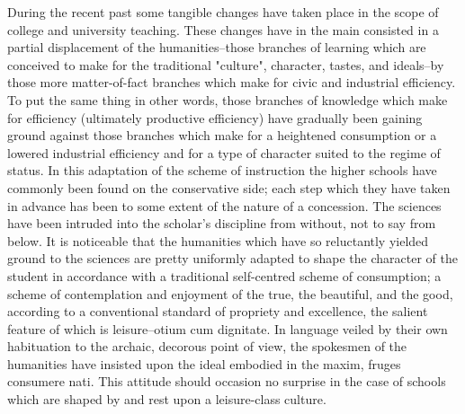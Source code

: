 \documentclass[12pt]{report}
\begin{document}
During the recent past some tangible changes have taken place in the
scope of college and university teaching. These changes have in the main
consisted in a partial displacement of the humanities--those branches
of learning which are conceived to make for the traditional "culture",
character, tastes, and ideals--by those more matter-of-fact branches
which make for civic and industrial efficiency. To put the same thing
in other words, those branches of knowledge which make for efficiency
(ultimately productive efficiency) have gradually been gaining ground
against those branches which make for a heightened consumption or a
lowered industrial efficiency and for a type of character suited to the
regime of status. In this adaptation of the scheme of instruction the
higher schools have commonly been found on the conservative side; each
step which they have taken in advance has been to some extent of
the nature of a concession. The sciences have been intruded into
the scholar's discipline from without, not to say from below. It is
noticeable that the humanities which have so reluctantly yielded ground
to the sciences are pretty uniformly adapted to shape the character
of the student in accordance with a traditional self-centred scheme of
consumption; a scheme of contemplation and enjoyment of the true,
the beautiful, and the good, according to a conventional standard of
propriety and excellence, the salient feature of which is leisure--otium
cum dignitate. In language veiled by their own habituation to the
archaic, decorous point of view, the spokesmen of the humanities have
insisted upon the ideal embodied in the maxim, fruges consumere nati.
This attitude should occasion no surprise in the case of schools which
are shaped by and rest upon a leisure-class culture.
\end{document}
